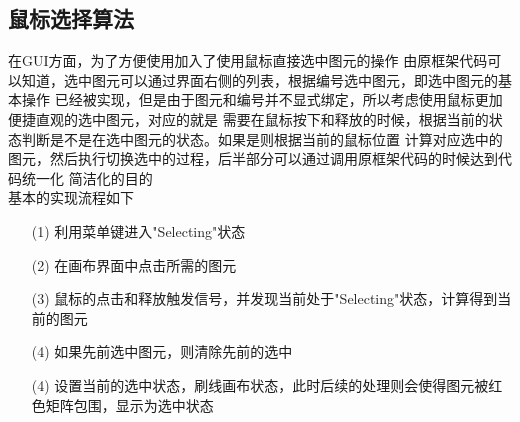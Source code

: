 \documentclass[a4paper,UTF8]{article}
\theoremstyle{definition}
\begin{document}
\subsection{鼠标选择算法}
在GUI方面，为了方便使用加入了使用鼠标直接选中图元的操作
由原框架代码可以知道，选中图元可以通过界面右侧的列表，根据编号选中图元，即选中图元的基本操作
已经被实现，但是由于图元和编号并不显式绑定，所以考虑使用鼠标更加便捷直观的选中图元，对应的就是
需要在鼠标按下和释放的时候，根据当前的状态判断是不是在选中图元的状态。如果是则根据当前的鼠标位置
计算对应选中的图元，然后执行切换选中的过程，后半部分可以通过调用原框架代码的时候达到代码统一化
简洁化的目的\\
基本的实现流程如下

\begin{itemize}
    \item [(1)] 
    利用菜单键进入"Selecting"状态
    \item [(2)]
    在画布界面中点击所需的图元
    \item [(3)]
    鼠标的点击和释放触发信号，并发现当前处于"Selecting"状态，计算得到当前的图元
    \item [(4)]
    如果先前选中图元，则清除先前的选中
    \item [(4)]
    设置当前的选中状态，刷线画布状态，此时后续的处理则会使得图元被红色矩阵包围，显示为选中状态
  \end{itemize}
\end{document}
